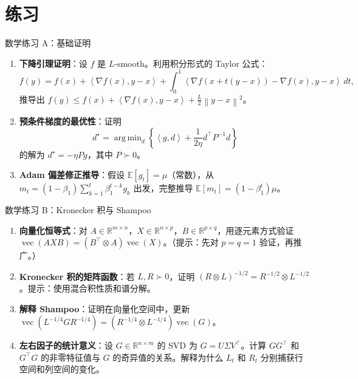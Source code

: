 \documentclass[aspectratio=169,10pt]{ctexbeamer}
\newcommand{\R}{\mathbb{R}}
\newcommand{\E}{\mathbb{E}}
\newcommand{\vect}{\operatorname{vec}}
\newcommand{\grad}{\nabla}
\newcommand{\norm}[1]{\left\lVert #1 \right\rVert}
\newcommand{\ip}[2]{\left\langle #1,#2 \right\rangle}
\DeclareMathOperator*{\argmin}{arg\,min}
\begin{document}
\section{练习}

\begin{frame}{数学练习 A：基础证明}
\begin{enumerate}
  \item \textbf{下降引理证明}：设 $f$ 是 $L$-smooth。利用积分形式的 Taylor 公式：
  \[
    f(y)=f(x)+\ip{\grad f(x)}{y-x}+\int_0^1\ip{\grad f(x+t(y-x))-\grad f(x)}{y-x}\,dt,
  \]
  推导出 $f(y)\le f(x)+\ip{\grad f(x)}{y-x}+\frac{L}{2}\norm{y-x}^2$。
  \item \textbf{预条件梯度的最优性}：证明
  \[
    d^\star=\argmin_{d}\left\{\ip{g}{d}+\frac{1}{2\eta}d^\top P^{-1}d\right\}
  \]
  的解为 $d^\star=-\eta P g$，其中 $P\succ0$。
  \item \textbf{Adam 偏差修正推导}：假设 $\E[g_t]=\mu$（常数），从 $m_t=(1-\beta_1)\sum_{k=1}^t\beta_1^{t-k}g_k$ 出发，完整推导 $\E[m_t]=(1-\beta_1^t)\mu$。
\end{enumerate}
\end{frame}

\begin{frame}{数学练习 B：Kronecker 积与 Shampoo}
\begin{enumerate}
  \item \textbf{向量化恒等式}：对 $A\in\R^{m\times n}$，$X\in\R^{n\times p}$，$B\in\R^{p\times q}$，用逐元素方式验证 $\vect(AXB)=(B^\top\otimes A)\vect(X)$。（提示：先对 $p=q=1$ 验证，再推广。）
  \item \textbf{Kronecker 积的矩阵函数}：若 $L,R\succ0$，证明 $(R\otimes L)^{-1/2}=R^{-1/2}\otimes L^{-1/2}$。提示：使用混合积性质和谱分解。
  \item \textbf{解释 Shampoo}：证明在向量化空间中，更新 $\vect(L^{-1/4}GR^{-1/4})=(R^{-1/4}\otimes L^{-1/4})\vect(G)$。
  \item \textbf{左右因子的统计意义}：设 $G\in\R^{n\times m}$ 的 SVD 为 $G=U\Sigma V^\top$。计算 $GG^\top$ 和 $G^\top G$ 的非零特征值与 $G$ 的奇异值的关系。解释为什么 $L_t$ 和 $R_t$ 分别捕获行空间和列空间的变化。
\end{enumerate}
\end{frame}
\end{document}
